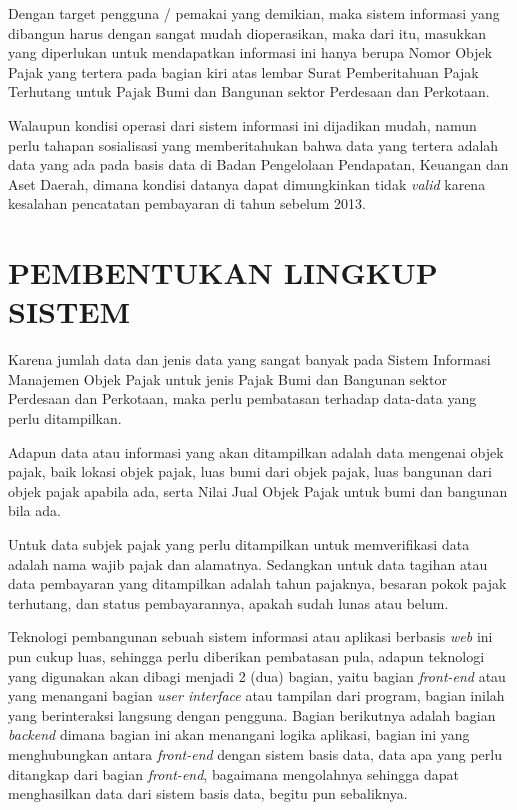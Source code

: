 \documentclass[pdftex,12pt, oneside]{article}
\begin{document}
Dengan target pengguna / pemakai yang demikian, maka sistem informasi yang dibangun harus dengan sangat mudah dioperasikan, maka dari itu, masukkan yang diperlukan untuk mendapatkan informasi ini hanya berupa Nomor Objek Pajak yang tertera pada bagian kiri atas lembar Surat Pemberitahuan Pajak Terhutang untuk Pajak Bumi dan Bangunan sektor Perdesaan dan Perkotaan.

Walaupun kondisi operasi dari sistem informasi ini dijadikan mudah, namun perlu tahapan sosialisasi yang memberitahukan bahwa data yang tertera adalah data yang ada pada basis data di Badan Pengelolaan Pendapatan, Keuangan dan Aset Daerah, dimana kondisi datanya dapat dimungkinkan tidak \textit{valid} karena kesalahan pencatatan pembayaran di tahun sebelum 2013.

\section{PEMBENTUKAN LINGKUP SISTEM}

Karena jumlah data dan jenis data yang sangat banyak pada Sistem Informasi Manajemen Objek Pajak untuk jenis Pajak Bumi dan Bangunan sektor Perdesaan dan Perkotaan, maka perlu pembatasan terhadap data-data yang perlu ditampilkan.

Adapun data atau informasi yang akan ditampilkan adalah data mengenai objek pajak, baik lokasi objek pajak, luas bumi dari objek pajak, luas bangunan dari objek pajak apabila ada, serta Nilai Jual Objek Pajak untuk bumi dan bangunan bila ada.

Untuk data subjek pajak yang perlu ditampilkan untuk memverifikasi data adalah nama wajib pajak dan alamatnya. Sedangkan untuk data tagihan atau data pembayaran yang ditampilkan adalah tahun pajaknya, besaran pokok pajak terhutang, dan status pembayarannya, apakah sudah lunas atau belum.

Teknologi pembangunan sebuah sistem informasi atau aplikasi berbasis \textit{web} ini pun cukup luas, sehingga perlu diberikan pembatasan pula, adapun teknologi yang digunakan akan dibagi menjadi 2 (dua) bagian, yaitu bagian \textit{front-end} atau yang menangani bagian \textit{user interface} atau tampilan dari program, bagian inilah yang berinteraksi langsung dengan pengguna. Bagian berikutnya adalah bagian \textit{backend} dimana bagian ini akan menangani logika aplikasi, bagian ini yang menghubungkan antara \textit{front-end} dengan sistem basis data, data apa yang perlu ditangkap dari bagian \textit{front-end}, bagaimana mengolahnya sehingga dapat menghasilkan data dari sistem basis data, begitu pun sebaliknya.
\end{document}
